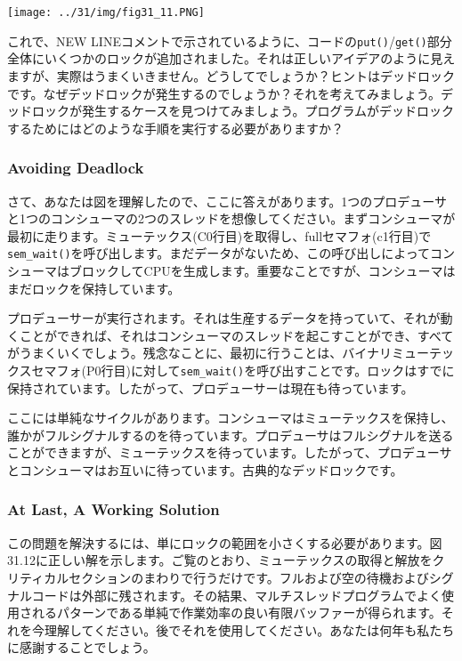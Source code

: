 \texttt{[image: ../31/img/fig31\_11.PNG]}

これで、NEW
LINEコメントで示されているように、コードの\texttt{put()}/\texttt{get()}部分全体にいくつかのロックが追加されました。それは正しいアイデアのように見えますが、実際はうまくいきません。どうしてでしょうか？ヒントはデッドロックです。なぜデッドロックが発生するのでしょうか？それを考えてみましょう。デッドロックが発生するケースを見つけてみましょう。プログラムがデッドロックするためにはどのような手順を実行する必要がありますか？

\hypertarget{avoiding-deadlock}{%
\subsubsection*{Avoiding Deadlock}\label{avoiding-deadlock}}

さて、あなたは図を理解したので、ここに答えがあります。1つのプロデューサと1つのコンシューマの2つのスレッドを想像してください。まずコンシューマが最初に走ります。ミューテックス(C0行目)を取得し、fullセマフォ(c1行目)で\texttt{sem\_wait()}を呼び出します。まだデータがないため、この呼び出しによってコンシューマはブロックしてCPUを生成します。重要なことですが、コンシューマはまだロックを保持しています。

プロデューサーが実行されます。それは生産するデータを持っていて、それが動くことができれば、それはコンシューマのスレッドを起こすことができ、すべてがうまくいくでしょう。残念なことに、最初に行うことは、バイナリミューテックスセマフォ(P0行目)に対して\texttt{sem\_wait()}を呼び出すことです。ロックはすでに保持されています。したがって、プロデューサーは現在も待っています。

ここには単純なサイクルがあります。コンシューマはミューテックスを保持し、誰かがフルシグナルするのを待っています。プロデューサはフルシグナルを送ることができますが、ミューテックスを待っています。したがって、プロデューサとコンシューマはお互いに待っています。古典的なデッドロックです。

\hypertarget{at-last-a-working-solution}{%
\subsubsection*{At Last, A Working
Solution}\label{at-last-a-working-solution}}

この問題を解決するには、単にロックの範囲を小さくする必要があります。図31.12に正しい解を示します。ご覧のとおり、ミューテックスの取得と解放をクリティカルセクションのまわりで行うだけです。フルおよび空の待機およびシグナルコードは外部に残されます。その結果、マルチスレッドプログラムでよく使用されるパターンである単純で作業効率の良い有限バッファーが得られます。それを今理解してください。後でそれを使用してください。あなたは何年も私たちに感謝することでしょう。


